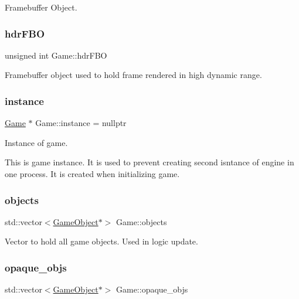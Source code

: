 Framebuffer Object. 

\mbox{\label{class_game_aecf2b0705e36b7b510be741add10f974}} 
\subsubsection{\texorpdfstring{hdrFBO}{hdrFBO}}
{\footnotesize\ttfamily unsigned int Game\+::hdr\+F\+BO\hspace{0.3cm}{\ttfamily [protected]}}



Framebuffer object used to hold frame rendered in high dynamic range. 

\mbox{\label{class_game_aa469cdc0a30f4fd2d6d99b23f4fbf257}} 
\subsubsection{\texorpdfstring{instance}{instance}}
{\footnotesize\ttfamily \mbox{\hyperlink{class_game}{Game}} $\ast$ Game\+::instance = nullptr\hspace{0.3cm}{\ttfamily [static]}}



Instance of game. 

This is game instance. It is used to prevent creating second isntance of engine in one process. It is created when initializing game. \mbox{\label{class_game_ac025aa21d226a5beb9ba19bc418af894}} 
\subsubsection{\texorpdfstring{objects}{objects}}
{\footnotesize\ttfamily std\+::vector$<$\mbox{\hyperlink{class_game_object}{Game\+Object}}$\ast$$>$ Game\+::objects}



Vector to hold all game objects. Used in logic update. 

\mbox{\label{class_game_affc1bb149ae6c474261ba1bfe133af07}} 
\subsubsection{\texorpdfstring{opaque\_objs}{opaque\_objs}}
{\footnotesize\ttfamily std\+::vector$<$\mbox{\hyperlink{class_game_object}{Game\+Object}}$\ast$$>$ Game\+::opaque\+\_\+objs}



